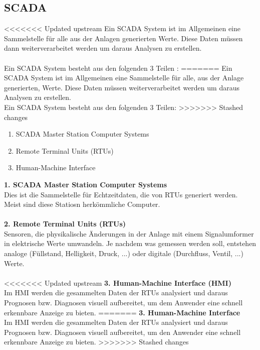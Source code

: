 \subsection{\ac{SCADA}}
<<<<<<< Updated upstream
Ein \ac{SCADA} System ist im Allgemeinen eine Sammelstelle für alle aus der Anlagen generierten Werte. Diese Daten müssen dann weiterverarbeitet werden um daraus Analysen zu erstellen.\\\\

Ein \ac{SCADA} System besteht aus den folgenden 3 Teilen \cite{scada_system}:
=======
Ein \ac{SCADA} System ist im Allgemeinen eine Sammelstelle für alle, aus der Anlage generierten, Werte. Diese Daten müssen weiterverarbeitet werden um daraus Analysen zu erstellen.\\
Ein \ac{SCADA} System besteht aus den folgenden 3 Teilen:
>>>>>>> Stashed changes
\begin{enumerate}
	\item \ac{SCADA} Master Station Computer Systems
	\item Remote Terminal Units (RTUs)
	\item Human-Machine Interface
\end{enumerate}

\textbf{1. \ac{SCADA} Master Station Computer Systems}\\
Dies ist die Sammelstelle für Echtzeitdaten, die von RTUs generiert werden. Meist sind diese Statiosn herkömmliche Computer.\\ 
\\
\textbf{2. Remote Terminal Units (RTUs)}\\
Sensoren, die physikalische Änderungen in der Anlage mit einem Signalumformer in elektrische Werte umwandeln. Je nachdem was gemessen werden soll, entstehen analoge (Füllstand, Helligkeit, Druck, ...) oder digitale (Durchfluss, Ventil, ...) Werte.\\
\\
<<<<<<< Updated upstream
\textbf{3. Human-Machine Interface (HMI)}\\
Im HMI werden die gesammelten Daten der RTUs analysiert und daraus Prognosen bzw. Diagnosen visuell aufbereitet, um dem Anwender eine schnell erkennbare Anzeige zu bieten.
=======
\textbf{3. Human-Machine Interface}\\
Im HMI werden die gesammelten Daten der RTUs analysiert und daraus Prognosen bzw. Diagnosen visuell aufbereitet, um den Anwender eine schnell erkennbare Anzeige zu bieten.\cite{scada_system}
>>>>>>> Stashed changes

